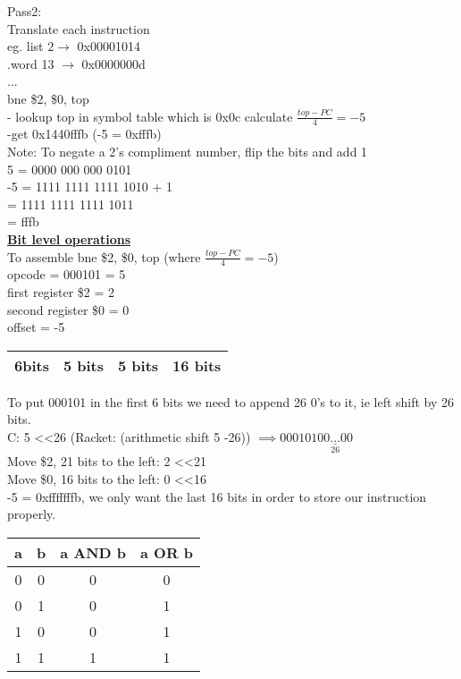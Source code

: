 \documentclass[12pt]{article}
\newcommand{\myt}[1]{\textbf{\underline{#1}}}
\begin{document}
	Pass2: \\
	Translate each instruction\\
	eg. list $2 \rightarrow $ 0x00001014\\
	.word 13 $\rightarrow$ 0x0000000d\\
	...\\
	bne \$2, \$0, top\\
	- lookup top in symbol table which is 0x0c calculate $\frac{top-PC}{4} = -5$\\
	-get 0x1440fffb (-5 = 0xfffb)\\
	
	Note: To negate a 2's compliment number, flip the bits and add 1\\
	5 = 0000 000 000 0101\\
	-5 = 1111 1111 1111 1010 + 1\\
	= 1111 1111 1111 1011\\
	= fffb\\
	
	\myt{Bit level operations}\\
	To assemble bne \$2, \$0, top (where $\frac{top-PC}{4} = -5$)\\
	opcode = 000101 = 5\\
	first register \$2 = 2\\
	second register \$0 = 0\\
	offset = -5\\
	
	\begin{tabular}{|c | c | c | c |}
		6bits & 5 bits & 5 bits & 16 bits \\ \hline
	\end{tabular}
	To put 000101 in the first 6 bits we need to append 26 0's to it, ie left shift by 26 bits.\\
	C: 5 \textless \textless 26 (Racket: (arithmetic shift 5 -26))
	$\implies 000101\underset{26}{\underline{00...00}}$\\
	
	Move \$2, 21 bits to the left: 2 \textless \textless 21\\
	Move \$0, 16 bits to the left: 0 \textless \textless 16\\
	
	-5 = 0xfffffffb, we only want the last 16 bits in order to store our instruction properly.\\
	
	\begin{tabular}{c | c | c | c}
		a & b & a AND b & a OR b \\ \hline
		0 & 0 & 0 & 0 \\
		0 & 1 & 0 & 1 \\
		1 & 0 & 0 & 1 \\
		1 & 1 & 1 & 1 \\
	\end{tabular}
	
\end{document}
